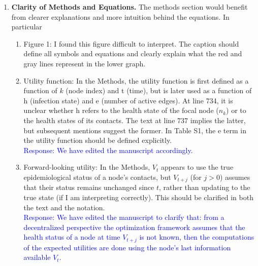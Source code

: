 \documentclass{article}
\newcommand{\blue}[1]{{\textcolor{blue}{#1}}}
\newcommand{\allblue}[1]{\color{blue}{#1}\color{black}}
\begin{document}
\begin{enumerate}
    The model structure also needs more grounding, especially the choice of utility function and optimization procedure. Are the functional forms and parameter values based on empirical studies or behavioral theory? For example, is it reasonable to assume that individuals know the disease state of their contacts or the value of the transmission rate ($\beta$)? Without clearer justification, it is hard to assess whether these assumptions capture actual decision-making dynamics or how the model results should be interpreted in a public health context.

\allblue{\\Response:

}

    \item {\bf Clarity of Methods and Equations.}
    The methods section would benefit from clearer explanations and more intuition behind the equations. In particular

    \begin{enumerate}
        \item Figure 1: I found this figure difficult to interpret. The caption should define all symbols and equations and clearly explain what the red and gray lines represent in the lower graph.
        \allblue{\\Response:
        We have edited the figure to clarify the epidemic component denoted by the nodes' health states, and the adaptive behavior component denoted by removed edges. We also edited the caption to describe the loop between these components.
        }

        \item Utility function: In the Methods, the utility function is first defined as a function of $k$ (node index) and t (time), but is later used as a function of h (infection state) and e (number of active edges). At line 734, it is unclear whether h refers to the health state of the focal node ($n_k$) or to the health states of its contacts. The text at line 737 implies the latter, but subsequent mentions suggest the former. In Table S1, the e term in the utility function should be defined explicitly.
        \blue{\\Response:
        We have edited the manuscript accordingly.
        }

        \item Forward-looking utility: In the Methods, $V_t$ appears to use the true epidemiological status of a node’s contacts, but $V_{t+j}$ (for $j>0$) assumes that their status remains unchanged since $t$, rather than updating to the true state (if I am interpreting correctly). This should be clarified in both the text and the notation.
        \blue{\\Response:
        We have edited the manuscript to clarify that: from a decentralized perspective the optimization framework assumes that the health status of a node at time $V_{t+j}$ is not known, then the computations of the expected utilities are done using the node's last information available $V_t$.
        }


\end{enumerate}
\end{enumerate}
\end{document}
